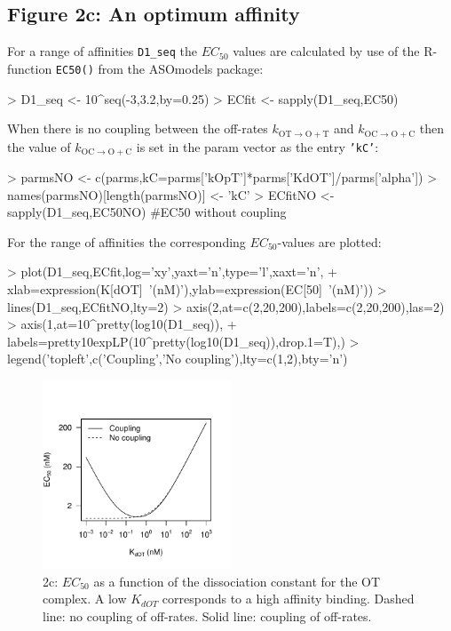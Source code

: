 \documentclass{article}
\newenvironment{Ncenter}{%
  \setlength\topsep{-10pt}
  \setlength\parskip{-100pt}
  \begin{center}
}{%
  \end{center}
}
\newcommand{\kmo}{k_{\mathrm{OT \to O+T}}}
\newcommand{\kD}{k_{\mathrm{OC \to O+C}}}
\begin{document}
\subsection*{Figure 2c: An optimum affinity}
For a range of affinities \texttt{D1\_seq} the $EC_{50}$ values are calculated by use of the R-function \texttt{EC50()} from the ASOmodels package:
\begin{Schunk}
\begin{Sinput}
> D1_seq <- 10^seq(-3,3.2,by=0.25)
> ECfit <- sapply(D1_seq,EC50)
\end{Sinput}
\end{Schunk}
When there is no coupling between the off-rates $\kmo$ and $\kD$ then the value of $\kD$ is set in the param vector as the entry \texttt{'kC'}:
\begin{Schunk}
\begin{Sinput}
> parmsNO <- c(parms,kC=parms['kOpT']*parms['KdOT']/parms['alpha'])
> names(parmsNO)[length(parmsNO)] <- 'kC'
> ECfitNO <- sapply(D1_seq,EC50NO) #EC50 without coupling
\end{Sinput}
\end{Schunk}
For the range of affinities the corresponding $EC_{50}$-values are plotted:
\begin{Schunk}
\begin{Sinput}
> plot(D1_seq,ECfit,log='xy',yaxt='n',type='l',xaxt='n',
+      xlab=expression(K[dOT]~'(nM)'),ylab=expression(EC[50]~'(nM)'))
> lines(D1_seq,ECfitNO,lty=2)
> axis(2,at=c(2,20,200),labels=c(2,20,200),las=2)
> axis(1,at=10^pretty(log10(D1_seq)),
+      labels=pretty10expLP(10^pretty(log10(D1_seq)),drop.1=T),)
> legend('topleft',c('Coupling','No coupling'),lty=c(1,2),bty='n')
\end{Sinput}
\end{Schunk}
\begin{figure}[!h]
\begin{Ncenter}
\includegraphics[width=0.5\textwidth]{Vignette2-Fig3}
\end{Ncenter}
\caption{2c: $EC_{50}$ as a function of the dissociation constant for the OT complex. A low $K_{dOT}$ corresponds to a high affinity binding. Dashed line: no coupling of off-rates. Solid line: coupling of off-rates.}
\end{figure}
\end{document}
